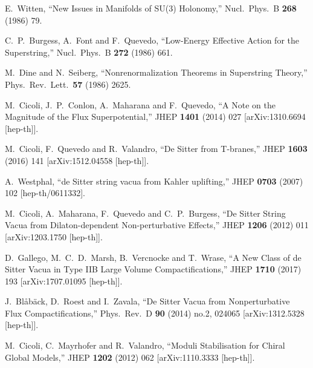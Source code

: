 \documentclass[11pt,a4paper]{article}
\begin{document}
\begin{itemize}
\begin{thebibliography}{99}
  E.~Witten,
  ``New Issues in Manifolds of SU(3) Holonomy,''
  Nucl.\ Phys.\ B {\bf 268} (1986) 79.

  C.~P.~Burgess, A.~Font and F.~Quevedo,
  ``Low-Energy Effective Action for the Superstring,''
  Nucl.\ Phys.\ B {\bf 272} (1986) 661.

  M.~Dine and N.~Seiberg,
  ``Nonrenormalization Theorems in Superstring Theory,''
  Phys.\ Rev.\ Lett.\  {\bf 57} (1986) 2625.

  M.~Cicoli, J.~P.~Conlon, A.~Maharana and F.~Quevedo,
  ``A Note on the Magnitude of the Flux Superpotential,''
  JHEP {\bf 1401} (2014) 027
  [arXiv:1310.6694 [hep-th]].

  M.~Cicoli, F.~Quevedo and R.~Valandro,
  ``De Sitter from T-branes,''
  JHEP {\bf 1603} (2016) 141
  [arXiv:1512.04558 [hep-th]].

  A.~Westphal,
  ``de Sitter string vacua from Kahler uplifting,''
  JHEP {\bf 0703} (2007) 102
  [hep-th/0611332].

  M.~Cicoli, A.~Maharana, F.~Quevedo and C.~P.~Burgess,
  ``De Sitter String Vacua from Dilaton-dependent Non-perturbative Effects,''
  JHEP {\bf 1206} (2012) 011
  [arXiv:1203.1750 [hep-th]].

  D.~Gallego, M.~C.~D.~Marsh, B.~Vercnocke and T.~Wrase,
  ``A New Class of de Sitter Vacua in Type IIB Large Volume Compactifications,''
  JHEP {\bf 1710} (2017) 193
  [arXiv:1707.01095 [hep-th]].
  
  J.~Blåbäck, D.~Roest and I.~Zavala,
  ``De Sitter Vacua from Nonperturbative Flux Compactifications,''
  Phys.\ Rev.\ D {\bf 90} (2014) no.2,  024065
  [arXiv:1312.5328 [hep-th]].

  M.~Cicoli, C.~Mayrhofer and R.~Valandro,
  ``Moduli Stabilisation for Chiral Global Models,''
  JHEP {\bf 1202} (2012) 062
  [arXiv:1110.3333 [hep-th]].


\end{thebibliography}
\end{itemize}
\end{document}
